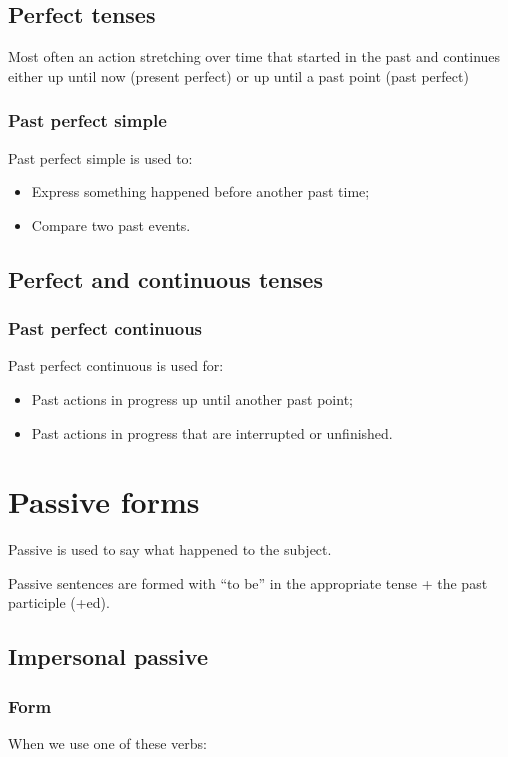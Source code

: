 \documentclass{article}
\begin{document}
\subsection{Perfect tenses}
Most often an action stretching over time that started in the past
and continues either up until now (present perfect) or up until a
past point (past perfect)

\subsubsection{Past perfect simple}
Past perfect simple is used to:
\begin{itemize}
    \item Express something happened before another past time;
    \item Compare two past events.
\end{itemize}

\subsection{Perfect and continuous tenses}
\subsubsection{Past perfect continuous}
Past perfect continuous is used for:
\begin{itemize}
    \item Past actions in progress up until another past point;
    \item Past actions in progress that are interrupted or unfinished.
\end{itemize}

\section{Passive forms}
Passive is used to say what happened to the subject.

Passive sentences are formed with ``to be'' in the appropriate tense
+ the past participle (+ed).

\subsection{Impersonal passive}
\subsubsection{Form}
When we use one of these verbs:
\end{document}
